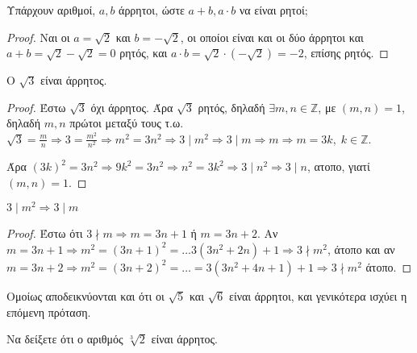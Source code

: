 \documentclass[main.tex]{subfiles}
\begin{document}
\begin{example}
  Υπάρχουν αριθμοί, $ a,b $ άρρητοι, ώστε $ a+b, a\cdot b $ να είναι ρητοί;
\end{example}

\begin{proof}
  Ναι οι $ a= \sqrt{2} $ και $ b= - \sqrt{2} $, οι οποίοι είναι και οι δύο άρρητοι 
  και $ a+b= \sqrt{2} - \sqrt{2} = 0 $ ρητός, και $ a\cdot b = \sqrt{2} \cdot (- 
  \sqrt{2}) = -2 $, επίσης ρητός.
\end{proof}

\begin{example}
  Ο $ \sqrt{3} $ είναι άρρητος.
\end{example}

\begin{proof}
  Έστω $ \sqrt{3} $ όχι άρρητος. Άρα $ \sqrt{3} $ ρητός, δηλαδή $ \exists m,n 
  \in \mathbb{Z} $, με $ (m,n)=1 $, δηλαδή $ m,n $ πρώτοι μεταξύ τους
  τ.ω. $ \sqrt{3} = \frac{m}{n} \Rightarrow 3 = \frac{m^{2}}{n^{2}} \Rightarrow 
  m^{2} = 3n^{2} \Rightarrow 3 \mid m^{2} \Rightarrow 3 \mid m  \Rightarrow m 
  \Rightarrow m = 3k, \; k \in \mathbb{Z}$. 

  Άρα $ (3k)^{2} = 3n^{2} \Rightarrow 9k^{2}=3n^{2} \Rightarrow n^{2} = 3k^{2} 
  \Rightarrow 3 \mid n^{2} \Rightarrow  3 \mid n$,  ατοπο, γιατί $ (m,n)=1 $.
\end{proof}

\begin{lem}
  $ 3 \mid m^{2} \Rightarrow 3 \mid m $
\end{lem}

\begin{proof}
  Έστω ότι $ 3 \nmid m \Rightarrow m = 3n +1 $ ή $ m = 3n+2 $. 
  Αν $ m=3n+1 \Rightarrow m^{2} = (3n+1)^{2} = \ldots 3(3n^{2}+2n)+1 \Rightarrow 
  3 \nmid m^{2}$, άτοπο και αν $ m =3n+2 \Rightarrow m^{2}=(3n+2)^{2} = \ldots = 
  3(3n^{2}+4n+1)+1 \Rightarrow 3 \nmid m^{2}$ άτοπο.
\end{proof}

\begin{rem}
  Ομοίως αποδεικνύονται και ότι οι $ \sqrt{5}$ και  $ \sqrt{6} $ είναι άρρητοι, 
  και γενικότερα ισχύει η επόμενη πρόταση.
\end{rem}


\begin{example}
  Να δείξετε ότι ο αριθμός $ \sqrt[3]{2} $ είναι άρρητος.
\end{example}
\end{document}
